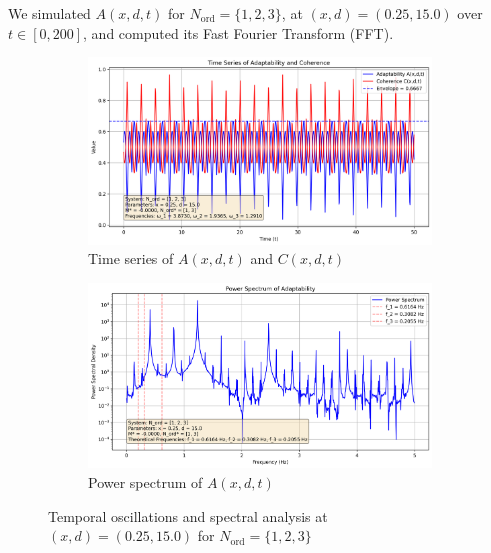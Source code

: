 \documentclass[11pt,a4paper]{article}
\begin{document}
We simulated $A(x,d,t)$ for $N_{\text{ord}}=\{1,2,3\}$, at $(x,d) = (0.25, 15.0)$ over $t \in [0,200]$, and computed its Fast Fourier Transform (FFT).

\begin{figure}[H]
    \centering
    \begin{subfigure}[b]{0.48\textwidth}
        \centering
        \includegraphics[width=\textwidth]{figures/time_series.png}
        \caption{Time series of $A(x,d,t)$ and $C(x,d,t)$}
        \label{fig:time_series}
    \end{subfigure}
    \hfill
    \begin{subfigure}[b]{0.48\textwidth}
        \centering
        \includegraphics[width=\textwidth]{figures/power_spectrum.png}
        \caption{Power spectrum of $A(x,d,t)$}
        \label{fig:power_spectrum}
    \end{subfigure}
    \caption{Temporal oscillations and spectral analysis at $(x,d) = (0.25, 15.0)$ for $N_{\text{ord}}=\{1,2,3\}$}
    \label{fig:temporal_analysis}
\end{figure}
\end{document}
